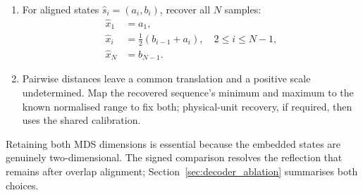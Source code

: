\documentclass[5p]{elsarticle}
\begin{document}
\begin{enumerate}
For fixed \(\eta\), the raw overlap residual is linear in \((\cos\theta,\sin\theta)\):
\[
b_i-a_{i+1}=A_i\cos\theta+B_i\sin\theta,
\quad
\begin{aligned}
A_i&=\eta Y_{i2}-Y_{i+1,1},\\
B_i&=-\eta Y_{i1}-Y_{i+1,2}.
\end{aligned}
\]
Hence for any \(\theta\) the optimal translation is the negated mean residual, \(\delta^\star=-\frac{1}{N-2}\sum_i(b_i-a_{i+1})\), and substituting it simply mean-centres the two coefficients. With \(\tilde A_i=A_i-\bar A\), \(\tilde B_i=B_i-\bar B\), and \(\tilde C=[\,\tilde A\;\;\tilde B\,]\in\mathbb R^{(N-2)\times2}\), the profiled objective is the quadratic form
\[
J\bigl(\theta,\delta^\star\bigr)=u^\top H_\eta u,
\qquad
H_\eta=\tilde C^\top\tilde C,
\qquad
u=\begin{bmatrix}\cos\theta\\ \sin\theta\end{bmatrix}.
\]
Because \(\lVert u\rVert=1\), minimising this Rayleigh quotient over the unit circle is an eigenproblem: the minimiser is the unit eigenvector of the symmetric \(2\times2\) matrix \(H_\eta\) belonging to its smaller eigenvalue. Both signs \(\pm u\) attain the same minimum, so the two parities give exactly four globally optimal candidates and no angular discretisation is required. Among them, select the orientation whose regenerated signed RP is closest to \(R^{\mathrm{obs}}\) in Frobenius norm, comparing both after normalisation to unit norm so the choice (and any tie among near-minimisers) is resolved independently of the unknown positive scale.
\item For aligned states \(\hat s_i=(a_i,b_i)\), recover all \(N\) samples:
\[
\begin{aligned}
\hat x_1 &= a_1,\\
\hat x_i &= \tfrac12(b_{i-1}+a_i),\quad 2\le i\le N-1,\\
\hat x_N &= b_{N-1}.
\end{aligned}
\]
\item Pairwise distances leave a common translation and a positive scale undetermined. Map the recovered sequence's minimum and maximum to the known normalised range to fix both; physical-unit recovery, if required, then uses the shared calibration.
\end{enumerate}

Retaining both MDS dimensions is essential because the embedded states are genuinely two-dimensional. The signed comparison resolves the reflection that remains after overlap alignment; Section~\ref{sec:decoder_ablation} summarises both choices.
\end{document}
